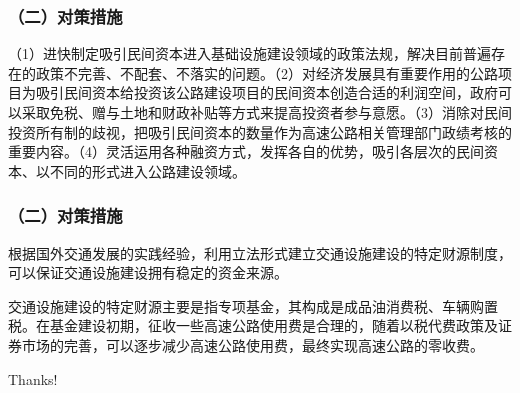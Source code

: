 \documentclass[aspectratio=169, 12pt]{beamer}
\begin{document}
\begin{frame}[plain]
    \frametitle{（二）对策措施}
    （1）进快制定吸引民间资本进入基础设施建设领域的政策法规，解决目前普遍存在的政策不完善、不配套、不落实的问题。（2）对经济发展具有重要作用的公路项目为吸引民间资本给投资该公路建设项目的民间资本创造合适的利润空间，政府可以采取免税、赠与土地和财政补贴等方式来提高投资者参与意愿。（3）消除对民间投资所有制的歧视，把吸引民间资本的数量作为高速公路相关管理部门政绩考核的重要内容。（4）灵活运用各种融资方式，发挥各自的优势，吸引各层次的民间资本、以不同的形式进入公路建设领域。
\end{frame}

\begin{frame}[plain]
    \frametitle{（二）对策措施}
    根据国外交通发展的实践经验，利用立法形式建立交通设施建设的特定财源制度，可以保证交通设施建设拥有稳定的资金来源。
    \par
    交通设施建设的特定财源主要是指专项基金，其构成是成品油消费税、车辆购置税。在基金建设初期，征收一些高速公路使用费是合理的，随着以税代费政策及证券市场的完善，可以逐步减少高速公路使用费，最终实现高速公路的零收费。
\end{frame}

\begin{frame}[standout]
    \begin{center}
        {\Huge\calligra Thanks!}
      \end{center}
\end{frame}
\end{document}
